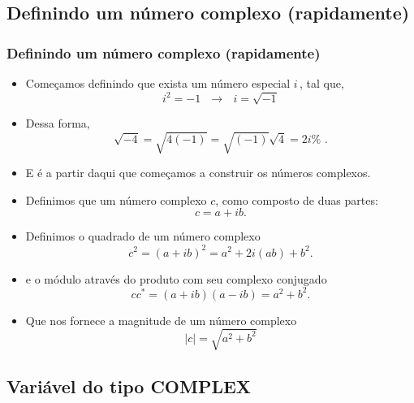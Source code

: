 \documentclass[xcolor=table]{beamer}
\newenvironment{stepitemize}{\begin{itemize}[<+->]}{\end{itemize} }
\begin{document}
\subsection{Definindo um n\'{u}mero complexo (rapidamente)}

\begin{frame}%

\frametitle{Definindo um n\'{u}mero complexo (rapidamente)}

\begin{stepitemize}
\item Come\c{c}amos definindo que exista um n\'{u}mero especial $i\,$, tal
que,%
\[
i^{2}=-1\text{ \ \ \ \ \ \ \ \ \ \ }\rightarrow \text{ \ \ \ \ \ \ \ \ \ \ }%
i=\sqrt{-1} 
\]

\item Dessa forma,%
\[
\sqrt{-4}=\sqrt{4\left( -1\right) }=\sqrt{\left( -1\right) }\sqrt{4}=2i\text{%
.} 
\]

\item E \'{e} a partir daqui que come\c{c}amos a construir os n\'{u}meros
complexos.

\item Definimos que um n\'{u}mero complexo $c$, como composto de duas
partes:%
\[
c=a+ib\text{.} 
\]

\item Definimos o quadrado de um n\'{u}mero complexo%
\[
c^{2}=\left( a+ib\right) ^{2}=a^{2}+2i\left( ab\right) +b^{2}. 
\]

\item e o m\'{o}dulo atrav\'{e}s do produto com seu complexo conjugado%
\[
cc^{\ast }=\left( a+ib\right) \left( a-ib\right) =a^{2}+b^{2}\text{.}
\]

\item Que nos fornece a magnitude de um n\'{u}mero complexo%
\[
\left\vert c\right\vert =\sqrt{a^{2}+b^{2}} 
\]
\end{stepitemize}

\transboxout%
\end{frame}%

\subsection{Vari\'{a}vel do tipo COMPLEX}
\end{document}

